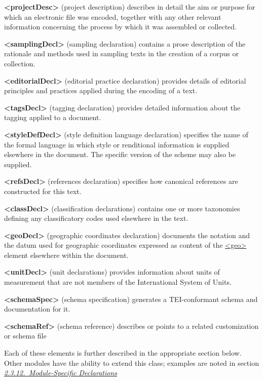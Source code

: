 \begin{sansreflist}
  
\item [\textbf{<projectDesc>}] (project description) describes in detail the aim or purpose for which an electronic file was encoded, together with any other relevant information concerning the process by which it was assembled or collected.
\item [\textbf{<samplingDecl>}] (sampling declaration) contains a prose description of the rationale and methods used in sampling texts in the creation of a corpus or collection.
\item [\textbf{<editorialDecl>}] (editorial practice declaration) provides details of editorial principles and practices applied during the encoding of a text.
\item [\textbf{<tagsDecl>}] (tagging declaration) provides detailed information about the tagging applied to a document.
\item [\textbf{<styleDefDecl>}] (style definition language declaration) specifies the name of the formal language in which style or renditional information is supplied elsewhere in the document. The specific version of the scheme may also be supplied.
\item [\textbf{<refsDecl>}] (references declaration) specifies how canonical references are constructed for this text.
\item [\textbf{<classDecl>}] (classification declarations) contains one or more taxonomies defining any classificatory codes used elsewhere in the text.
\item [\textbf{<geoDecl>}] (geographic coordinates declaration) documents the notation and the datum used for geographic coordinates expressed as content of the \hyperref[TEI.geo]{<geo>} element elsewhere within the document.
\item [\textbf{<unitDecl>}] (unit declarations) provides information about units of measurement that are not members of the International System of Units.
\item [\textbf{<schemaSpec>}] (schema specification) generates a TEI-conformant schema and documentation for it.
\item [\textbf{<schemaRef>}] (schema reference) describes or points to a related customization or schema file
\end{sansreflist}
Each of these elements is further described in the appropriate section below. Other modules have the ability to extend this class; examples are noted in section \textit{\hyperref[HDENCOTH]{2.3.12.\ Module-Specific Declarations}}
